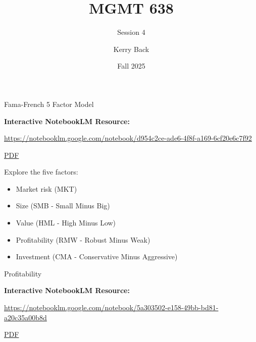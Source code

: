 \documentclass[aspectratio=169]{beamer}
\title{MGMT 638}
\subtitle{Session 4}
\author{Kerry Back}
\institute{}
\date{Fall 2025}
\begin{document}
\maketitle

\begin{frame}{Fama-French 5 Factor Model}

\textbf{Interactive NotebookLM Resource:}

\vspace{1em}

\url{https://notebooklm.google.com/notebook/d954c2ce-ade6-4f8f-a169-6cf20e6c7f92}

\vspace{0.5em}

\href{https://mgmt638.kerryback.com/Fama_French_JFE_2015.pdf}{PDF}

\vspace{1em}

Explore the five factors:
\begin{itemize}
    \item Market risk (MKT)
    \item Size (SMB - Small Minus Big)
    \item Value (HML - High Minus Low)
    \item Profitability (RMW - Robust Minus Weak)
    \item Investment (CMA - Conservative Minus Aggressive)
\end{itemize}

\end{frame}

\begin{frame}{Profitability}

\textbf{Interactive NotebookLM Resource:}

\vspace{1em}

\url{https://notebooklm.google.com/notebook/5a303502-e158-49bb-bd81-a20c35a00b8d}

\vspace{1em}

\href{https://mgmt638.kerryback.com/Novy-Marx_Medhat_2025.pdf}{PDF}

\end{frame}
\end{document}
